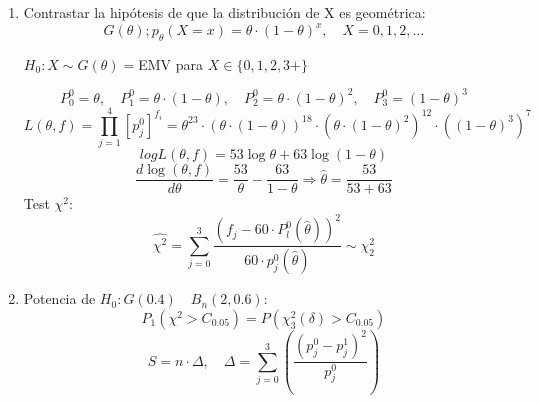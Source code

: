\begin{enumerate}[label=\alph*)]
    \item Contrastar la hipótesis de que la distribución de X es geométrica:
    \[
        G(\theta);p_\theta(X=x)=\theta \cdot (1- \theta)^x, \quad X=0,1,2,\dots
    \]

    $H_0: X \sim G(\theta)=$EMV para $X \in \{0,1,2,3+\}$

    \[
        P_0^0=\theta, \quad P_1^0=\theta \cdot (1-\theta), \quad P_2^0=\theta \cdot (1-\theta)^2, \quad P_3^0=(1-\theta)^3
    \]
    \[
        L(\theta,f)=\prod_{j=1}^{4}[p_j^0]^{f_i}= \theta^{23}\cdot(\theta \cdot (1-\theta))^{18} \cdot (\theta \cdot (1-\theta)^2)^{12} \cdot ((1-\theta)^3)^7
    \]
    \[
        log L(\theta,f)=53 \log \theta+63 \log (1-\theta)
    \]
    \[
        \frac{d \log(\theta,f)}{d \theta}=\frac{53}{\theta}-\frac{63}{1-\theta} \Longrightarrow \widehat{\theta}=\frac{53}{53+63}
    \]
    Test $\chi^2$:
    \[
        \widehat{\chi^2}=\sum_{j=0}^{3} \frac{(f_j-60\cdot P_l^0(\widehat{\theta}))^2}{60 \cdot p_j^0(\widehat{\theta})} \sim \chi^2_2
    \]

    \item Potencia de $H_0:G(0.4) \quad B_n(2,0.6)$:
    \[
        P_1(\chi^2> C_{0.05})=P(\chi_3^2(\delta)>C_{0.05})
    \]
    \[
        S=n \cdot \Delta, \quad \Delta=\sum_{j=0}^{3} \left(\frac{(p_j^0-p_j^1)^2}{p_j^0}\right)
    \]
\end{enumerate}
